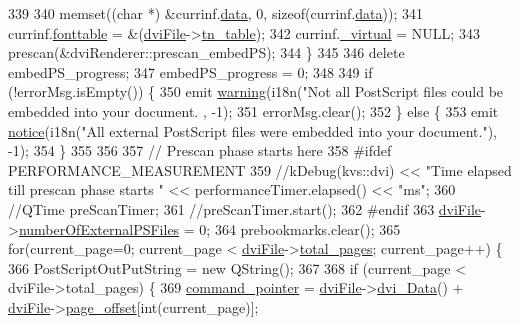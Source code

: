 \begin{DoxyCode}
339 
340     memset((\textcolor{keywordtype}{char} *) &currinf.\hyperlink{structdrawinf_af73f66288002f0a25c7843a534bf1340}{data}, 0, \textcolor{keyword}{sizeof}(currinf.\hyperlink{structdrawinf_af73f66288002f0a25c7843a534bf1340}{data}));
341     currinf.\hyperlink{structdrawinf_ac68bb33a017c34bf63f8dce71ad3ef17}{fonttable} = &(\hyperlink{classdviRenderer_a67ded13a1a8da343aa0ee921ed96d4c2}{dviFile}->\hyperlink{classdvifile_a05cb283609e6d1627940d14e8fc85b62}{tn\_table});
342     currinf.\hyperlink{structdrawinf_a9fef874e701c25d0d781612bd3f615a5}{\_virtual}  = NULL;
343     prescan(&dviRenderer::prescan\_embedPS);
344   \}
345 
346   \textcolor{keyword}{delete} embedPS\_progress;
347   embedPS\_progress = 0;
348 
349   \textcolor{keywordflow}{if} (!errorMsg.isEmpty()) \{
350     emit \hyperlink{classdviRenderer_a07b2460ad76478aa074720e2fd4876bd}{warning}(i18n(\textcolor{stringliteral}{"Not all PostScript files could be embedded into your document. %
      , -1);
351     errorMsg.clear();
352   \} \textcolor{keywordflow}{else} \{
353     emit \hyperlink{classdviRenderer_a28699d83c94c30eb2ab1d8b6de07b46a}{notice}(i18n(\textcolor{stringliteral}{"All external PostScript files were embedded into your document."}), -1);
354   \}
355 
356 
357   \textcolor{comment}{// Prescan phase starts here}
358 \textcolor{preprocessor}{#ifdef PERFORMANCE\_MEASUREMENT}
359   \textcolor{comment}{//kDebug(kvs::dvi) << "Time elapsed till prescan phase starts " << performanceTimer.elapsed() << "ms";}
360   \textcolor{comment}{//QTime preScanTimer;}
361   \textcolor{comment}{//preScanTimer.start();}
362 \textcolor{preprocessor}{#endif}
363   \hyperlink{classdviRenderer_a67ded13a1a8da343aa0ee921ed96d4c2}{dviFile}->\hyperlink{classdvifile_abd8bd3fc29f66ce9220efbd0246d7fc0}{numberOfExternalPSFiles} = 0;
364   prebookmarks.clear();
365   \textcolor{keywordflow}{for}(current\_page=0; current\_page < \hyperlink{classdviRenderer_a67ded13a1a8da343aa0ee921ed96d4c2}{dviFile}->\hyperlink{classdvifile_a71577dbd82a462b855abc96be3b369c5}{total\_pages}; current\_page++) \{
366     PostScriptOutPutString = \textcolor{keyword}{new} QString();
367 
368     \textcolor{keywordflow}{if} (current\_page < dviFile->total\_pages) \{
369       \hyperlink{classbigEndianByteReader_aa8919f6fe116fd3230337675fd23abac}{command\_pointer} = \hyperlink{classdviRenderer_a67ded13a1a8da343aa0ee921ed96d4c2}{dviFile}->\hyperlink{classdvifile_a81f1d32c52377a7b1802072eb40998b7}{dvi\_Data}() + 
      \hyperlink{classdviRenderer_a67ded13a1a8da343aa0ee921ed96d4c2}{dviFile}->\hyperlink{classdvifile_aeafc97277647ad5077a774be71b3253a}{page\_offset}[int(current\_page)];
}
\end{DoxyCode}
